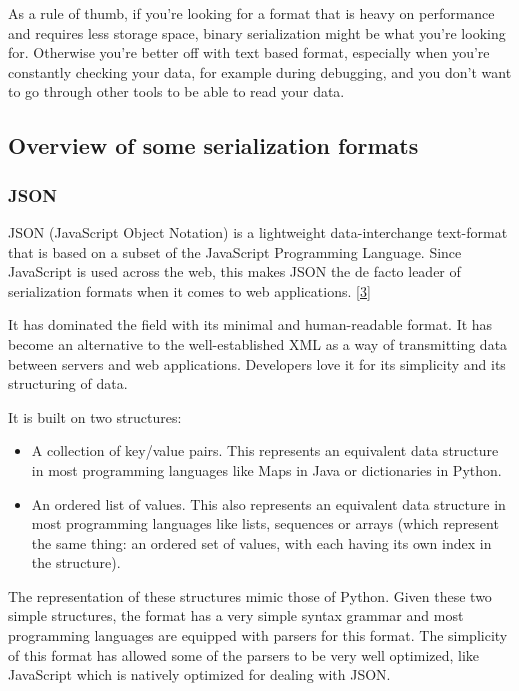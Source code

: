 \documentclass[12pt]{article}
\begin{document}
As a rule of thumb, if you’re looking for a format that is heavy on performance and requires less storage space, binary serialization might be what you’re looking for. Otherwise you’re better off with text based format, especially when you’re constantly checking your data, for example during debugging, and you don’t want to go through other tools to be able to read your data.

\pagebreak

\subsection{Overview of some serialization formats}

\subsubsection{JSON}
JSON (JavaScript Object Notation) is a lightweight data-interchange text-format that is based on a subset of the JavaScript Programming Language. Since JavaScript is used across the web, this makes JSON the de facto leader of serialization formats when it comes to web applications. \href{https://www.json.org/json-en.html}{[3]}

It has dominated the field with its minimal and human-readable format. It has become an alternative to the well-established XML as a way of transmitting data between servers and web applications. Developers love it for its simplicity and its structuring of data.

It is built on two structures:
\begin{itemize}
    \item A collection of key/value pairs. This represents an equivalent data structure in most programming languages like Maps in Java or dictionaries in Python.
    \item An ordered list of values. This also represents an equivalent data structure in most programming languages like lists, sequences or arrays (which represent the same thing: an ordered set of values, with each having its own index in the structure).
\end{itemize}

The representation of these structures mimic those of Python. Given these two simple structures, the format has a very simple syntax grammar and most programming languages are equipped with parsers for this format. The simplicity of this format has allowed some of the parsers to be very well optimized, like JavaScript which is natively optimized for dealing with JSON. 
\end{document}
